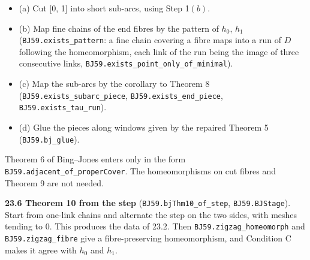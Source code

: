 \documentclass[11pt]{article}
\newcommand{\lean}[1]{\texttt{#1}}
\begin{document}
\begin{itemize}
  \item (a) Cut [0, 1] into short sub-arcs, using Step 1$(b)$.
  \item (b) Map fine chains of the end fibres by the pattern of $h_0$, $h_1$ (\lean{BJ59.\hspace{0pt}exists\_\hspace{0pt}pattern}: a fine chain covering a fibre maps into a run of $D$ following the homeomorphism, each link of the run being the image of three consecutive links, \lean{BJ59.\hspace{0pt}exists\_\hspace{0pt}point\_\hspace{0pt}only\_\hspace{0pt}of\_\hspace{0pt}minimal}).
  \item (c) Map the sub-arcs by the corollary to Theorem 8 (\lean{BJ59.\hspace{0pt}exists\_\hspace{0pt}subarc\_\hspace{0pt}piece}, \lean{BJ59.\hspace{0pt}exists\_\hspace{0pt}end\_\hspace{0pt}piece}, \lean{BJ59.\hspace{0pt}exists\_\hspace{0pt}tau\_\hspace{0pt}run}).
  \item (d) Glue the pieces along windows given by the repaired Theorem 5 (\lean{BJ59.\hspace{0pt}bj\_\hspace{0pt}glue}).
\end{itemize}

Theorem 6 of Bing--Jones enters only in the form \lean{BJ59.\hspace{0pt}adjacent\_\hspace{0pt}of\_\hspace{0pt}properCover}. The homeomorphisms on cut fibres and Theorem 9 are not needed.

\textbf{23.6 Theorem 10 from the step} (\lean{BJ59.\hspace{0pt}bjThm10\_\hspace{0pt}of\_\hspace{0pt}step}, \lean{BJ59.\hspace{0pt}BJStage}). Start from one-link chains and alternate the step on the two sides, with meshes tending to 0. This produces the data of 23.2. Then \lean{BJ59.\hspace{0pt}zigzag\_\hspace{0pt}homeomorph} and \lean{BJ59.\hspace{0pt}zigzag\_\hspace{0pt}fibre} give a fibre-preserving homeomorphism, and Condition C makes it agree with $h_0$ and $h_1$.
\end{document}

